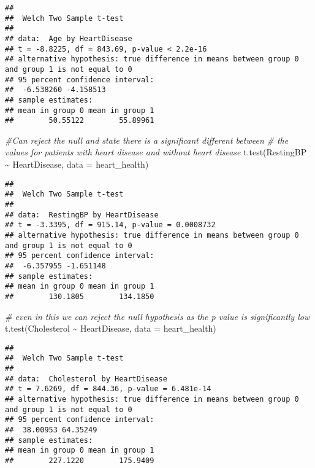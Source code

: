 \documentclass[
]{article}
\newenvironment{Shaded}{\begin{snugshade}}{\end{snugshade}}
\newcommand{\AttributeTok}[1]{\textcolor[rgb]{0.77,0.63,0.00}{#1}}
\newcommand{\CommentTok}[1]{\textcolor[rgb]{0.56,0.35,0.01}{\textit{#1}}}
\newcommand{\FunctionTok}[1]{\textcolor[rgb]{0.00,0.00,0.00}{#1}}
\newcommand{\NormalTok}[1]{#1}
\newcommand{\SpecialCharTok}[1]{\textcolor[rgb]{0.00,0.00,0.00}{#1}}
\begin{document}
\begin{verbatim}
## 
##  Welch Two Sample t-test
## 
## data:  Age by HeartDisease
## t = -8.8225, df = 843.69, p-value < 2.2e-16
## alternative hypothesis: true difference in means between group 0 and group 1 is not equal to 0
## 95 percent confidence interval:
##  -6.538260 -4.158513
## sample estimates:
## mean in group 0 mean in group 1 
##        50.55122        55.89961
\end{verbatim}

\begin{Shaded}
\begin{Highlighting}[]
\CommentTok{\#Can reject the null and state there is a significant different between }
\CommentTok{\# the values for patients with heart disease and without heart disease}
\FunctionTok{t.test}\NormalTok{(RestingBP }\SpecialCharTok{\textasciitilde{}}\NormalTok{ HeartDisease, }\AttributeTok{data =}\NormalTok{ heart\_health)}
\end{Highlighting}
\end{Shaded}

\begin{verbatim}
## 
##  Welch Two Sample t-test
## 
## data:  RestingBP by HeartDisease
## t = -3.3395, df = 915.14, p-value = 0.0008732
## alternative hypothesis: true difference in means between group 0 and group 1 is not equal to 0
## 95 percent confidence interval:
##  -6.357955 -1.651148
## sample estimates:
## mean in group 0 mean in group 1 
##        130.1805        134.1850
\end{verbatim}

\begin{Shaded}
\begin{Highlighting}[]
\CommentTok{\# even in this we can reject the null hypothesis as the p value is significantly low}
\FunctionTok{t.test}\NormalTok{(Cholesterol }\SpecialCharTok{\textasciitilde{}}\NormalTok{ HeartDisease, }\AttributeTok{data =}\NormalTok{ heart\_health)}
\end{Highlighting}
\end{Shaded}

\begin{verbatim}
## 
##  Welch Two Sample t-test
## 
## data:  Cholesterol by HeartDisease
## t = 7.6269, df = 844.36, p-value = 6.481e-14
## alternative hypothesis: true difference in means between group 0 and group 1 is not equal to 0
## 95 percent confidence interval:
##  38.00953 64.35249
## sample estimates:
## mean in group 0 mean in group 1 
##        227.1220        175.9409
\end{verbatim}
\end{document}
